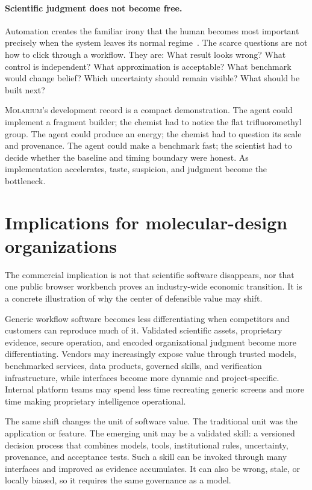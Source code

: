 \documentclass[11pt]{article}
\newcommand{\molarium}{\textnormal{\textsc{Molarium}}}
\begin{document}
\paragraph{Scientific judgment does not become free.}
Automation creates the familiar irony that the human becomes most important precisely when the system leaves its normal regime~\cite{bainbridge1983ironies}.
The scarce questions are not how to click through a workflow.
They are: What result looks wrong?
What control is independent?
What approximation is acceptable?
What benchmark would change belief?
Which uncertainty should remain visible?
What should be built next?

\molarium{}'s development record is a compact demonstration.
The agent could implement a fragment builder; the chemist had to notice the flat trifluoromethyl group.
The agent could produce an energy; the chemist had to question its scale and provenance.
The agent could make a benchmark fast; the scientist had to decide whether the baseline and timing boundary were honest.
As implementation accelerates, taste, suspicion, and judgment become the bottleneck.

\section{Implications for molecular-design organizations}
\label{sec:organizations}

The commercial implication is not that scientific software disappears, nor that one public browser workbench proves an industry-wide economic transition.
It is a concrete illustration of why the center of defensible value may shift.

Generic workflow software becomes less differentiating when competitors and customers can reproduce much of it.
Validated scientific assets, proprietary evidence, secure operation, and encoded organizational judgment become more differentiating.
Vendors may increasingly expose value through trusted models, benchmarked services, data products, governed skills, and verification infrastructure, while interfaces become more dynamic and project-specific.
Internal platform teams may spend less time recreating generic screens and more time making proprietary intelligence operational.

The same shift changes the unit of software value.
The traditional unit was the application or feature.
The emerging unit may be a validated skill: a versioned decision process that combines models, tools, institutional rules, uncertainty, provenance, and acceptance tests.
Such a skill can be invoked through many interfaces and improved as evidence accumulates.
It can also be wrong, stale, or locally biased, so it requires the same governance as a model.
\end{document}
